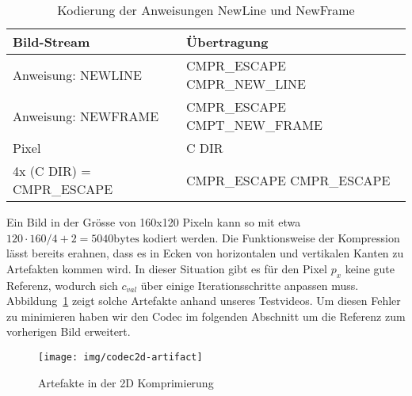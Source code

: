 \begin{table}[htbp]
\centering
\begin{tabular}{|l|l|}
\hline
Bild-Stream & \"Ubertragung \\ \hline
Anweisung: NEWLINE & CMPR\_ESCAPE CMPR\_NEW\_LINE \\
Anweisung: NEWFRAME & CMPR\_ESCAPE CMPT\_NEW\_FRAME \\
Pixel & C DIR \\
4x (C DIR) = CMPR\_ESCAPE & CMPR\_ESCAPE CMPR\_ESCAPE \\ 
\hline
\end{tabular}
\caption{Kodierung der Anweisungen NewLine und NewFrame}
\label{tbl:codec-symbols}
\end{table}

Ein Bild in der Gr\"osse von 160x120 Pixeln kann so mit etwa $120 \cdot 160/4 + 2 = 5040
\text{bytes}$ kodiert werden.
Die Funktionsweise der Kompression l\"asst bereits erahnen, dass es in Ecken von
horizontalen und vertikalen Kanten zu Artefakten kommen wird. In dieser
Situation gibt es f\"ur den Pixel $p_x$ keine gute Referenz, wodurch sich
$c_{val}$ \"uber einige Iterationsschritte anpassen muss.
Abbildung~\ref{fig:codec2d-artifact} zeigt solche Artefakte anhand unseres
Testvideos. Um diesen Fehler zu minimieren haben wir den Codec im folgenden
Abschnitt um die Referenz zum vorherigen Bild erweitert.
\begin{figure}[tbp]
\begin{center}
\texttt{[image: img/codec2d-artifact]}
\end{center}
\caption{Artefakte in der 2D Komprimierung}
\label{fig:codec2d-artifact}
\end{figure}
%
%
